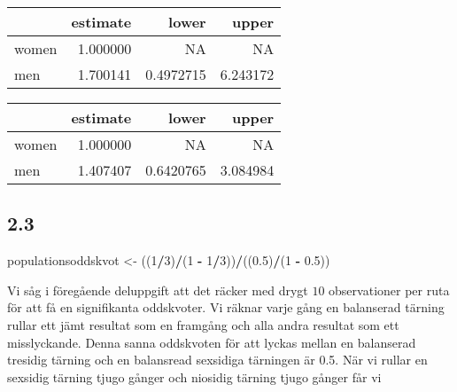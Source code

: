 \documentclass[]{article}
\newenvironment{Shaded}{\begin{snugshade}}{\end{snugshade}}
\newcommand{\DecValTok}[1]{\textcolor[rgb]{0.00,0.00,0.81}{#1}}
\newcommand{\FloatTok}[1]{\textcolor[rgb]{0.00,0.00,0.81}{#1}}
\newcommand{\KeywordTok}[1]{\textcolor[rgb]{0.13,0.29,0.53}{\textbf{#1}}}
\newcommand{\NormalTok}[1]{#1}
\newcommand{\OperatorTok}[1]{\textcolor[rgb]{0.81,0.36,0.00}{\textbf{#1}}}
\newcommand{\StringTok}[1]{\textcolor[rgb]{0.31,0.60,0.02}{#1}}
\begin{document}
\begin{longtable}[]{@{}lrrr@{}}
\toprule
& estimate & lower & upper\tabularnewline
\midrule
\endhead
women & 1.000000 & NA & NA\tabularnewline
men & 1.700141 & 0.4972715 & 6.243172\tabularnewline
\bottomrule
\end{longtable}

\begin{Shaded}
\end{Shaded}

\begin{longtable}[]{@{}lrrr@{}}
\toprule
& estimate & lower & upper\tabularnewline
\midrule
\endhead
women & 1.000000 & NA & NA\tabularnewline
men & 1.407407 & 0.6420765 & 3.084984\tabularnewline
\bottomrule
\end{longtable}

\hypertarget{section-4}{%
\subsection{2.3}\label{section-4}}

\begin{Shaded}
\begin{Highlighting}[]
\NormalTok{populationsoddskvot <-}\StringTok{ }\NormalTok{((}\DecValTok{1}\OperatorTok{/}\DecValTok{3}\NormalTok{)}\OperatorTok{/}\NormalTok{(}\DecValTok{1} \OperatorTok{-}\StringTok{ }\DecValTok{1}\OperatorTok{/}\DecValTok{3}\NormalTok{))}\OperatorTok{/}\NormalTok{((}\FloatTok{0.5}\NormalTok{)}\OperatorTok{/}\NormalTok{(}\DecValTok{1} \OperatorTok{-}\StringTok{ }\FloatTok{0.5}\NormalTok{))}
\end{Highlighting}
\end{Shaded}

Vi såg i föregående deluppgift att det räcker med drygt \(10\)
observationer per ruta för att få en signifikanta oddskvoter. Vi räknar
varje gång en balanserad tärning rullar ett jämt resultat som en
framgång och alla andra resultat som ett misslyckande. Denna sanna
oddskvoten för att lyckas mellan en balanserad tresidig tärning och en
balansread sexsidiga tärningen är 0.5. När vi rullar en sexsidig tärning
tjugo gånger och niosidig tärning tjugo gånger får vi
\end{document}
